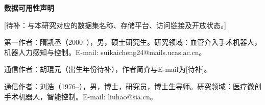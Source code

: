 \documentclass{JQRnew}
\providecommand{\RevisionColor}{\color{black}}
\newcommand{\revbegin}{\begingroup\RevisionColor}
\newcommand{\revend}{\par\endgroup}
\begin{document}
\noindent
\textbf{数据可用性声明}

\revbegin
[待补：与本研究对应的数据集名称、存储平台、访问链接及开放状态。]
\revend




\begin{AuthorIntroduction}
\Intro 第一作者：隋凯丞（2000--），男，硕士研究生。研究领域：血管介入手术机器人，机器人力感知与控制。E-mail: suikaicheng24@mails.ucas.ac.cn。
\revbegin

\Intro
通信作者：胡琨元（出生年份待补），作者简介与E-mail为[待补]。
\revend

\Intro 通信作者：刘浩（1976--），男，博士，研究员，博士生导师。研究领域：医疗微创手术机器人，智能控制。E-mail: liuhao@sia.cn。

\end{AuthorIntroduction}

\balance
\end{document}
